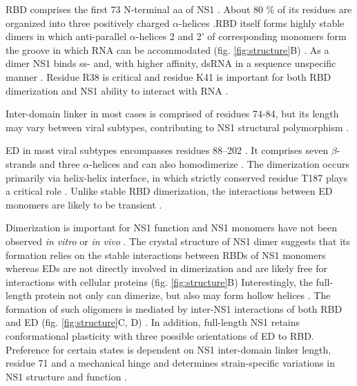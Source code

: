 		\gls{RBD} comprises the first 73 N-terminal aa of \gls{NS1} \parencite{Qian1995a, Yin2007a}. About 80 \% of its residues are organized into three positively charged $\alpha$-helices \parencite{Qian1995a, Liu1997}.\gls{RBD} itself forms highly stable dimers in which anti-parallel $\alpha$-helices 2 and 2' of corresponding monomers form the groove in which RNA can be accommodated (fig. \ref{fig:structure}B) \parencite{Chien1997, Wang1999}. As a dimer NS1 binds ss- and, with higher affinity, dsRNA in a sequence unspecific manner \parencite{Hatada1992, Chien1997, Qian1995}. Residue R38 is critical and residue K41 is important for both \gls{RBD} dimerization and \gls{NS1} ability to interact with RNA \parencite{Hatada1992, Wang1999}.
		
		Inter-domain linker in most cases is comprised of residues 74-84, but its length may vary between viral subtypes, contributing to \gls{NS1} structural polymorphism \parencite{Bornholdt2006, Carrillo2014, Kerry2011}.
		
		\gls{ED} in most viral subtypes encompasses residues 88--202 \parencite{Hale2014}. It comprises seven $\beta$-strands and three $\alpha$-helices and can also homodimerize \parencite{Bornholdt2006, Hale2008c, Xia2009}. The dimerization occurs primarily via helix-helix interface, in which strictly conserved residue T187 plays a critical role \parencite{Hale2008c, Kerry2011}. Unlike stable \gls{RBD} dimerization, the interactions between \gls{ED} monomers are likely to be transient \parencite{Kerry2011, Hale2014}.
		
		Dimerization is important for \gls{NS1} function and \gls{NS1} monomers have not been observed \textit{in vitro} or \textit{in vivo} \parencite{Hale2014}. The crystal structure of NS1 dimer suggests that its formation relies on the stable interactions between \glspl{RBD} of NS1 monomers whereas \glspl{ED} are not directly involved in dimerization and are likely free for interactions with cellular proteins (fig. \ref{fig:structure}B) \parencite{Bornholdt2008} Interestingly, the full-length protein not only can dimerize, but also may form hollow helices \parencite{Bornholdt2008}. The formation of such oligomers is mediated by inter-NS1 interactions of both \gls{RBD} and \gls{ED} (fig. \ref{fig:structure}C, D) \parencite{Bornholdt2008, Carrillo2014}. In addition, full-length \gls{NS1} retains conformational plasticity with three possible orientations of \gls{ED} to \gls{RBD}. Preference for certain states is dependent on \gls{NS1} inter-domain linker length, residue 71 and a mechanical hinge and determines strain-specific variations in \gls{NS1} structure and function \parencite{Carrillo2014}. 
		
